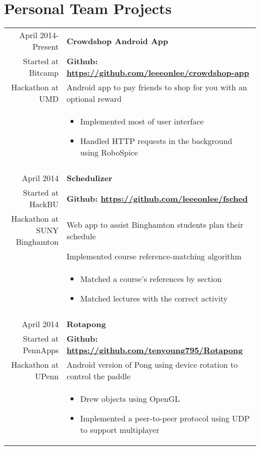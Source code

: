 \documentclass[letterpaper,10pt]{article} %
\begin{document}
\newpage
\section{Personal Team Projects}

\begin{longtable}{r|p{4.5in}}
    April 2014-Present & \textbf{Crowdshop Android App} \\
    Started at Bitcamp & \textbf{Github: \url{https://github.com/leeeonlee/crowdshop-app}} \\
    Hackathon at UMD & Android app to pay friends to shop for you with an optional reward \\
    & \begin{itemize}
        \item Implemented most of user interface
        \item Handled HTTP requests in the background using RoboSpice
    \end{itemize} \\

    \multicolumn{2}{c}{} \\

    April 2014 & \textbf{Schedulizer} \\
    Started at HackBU & \textbf{Github: \url{https://github.com/leeeonlee/fsched}} \\
    Hackathon at SUNY Binghamton & Web app to assist Binghamton students plan their schedule \\
    & Implemented course reference-matching algorithm \\ 
    & \begin{itemize}
        \item Matched a course's references by section
        \item Matched lectures with the correct activity
    \end{itemize} \\

    \multicolumn{2}{c}{} \\

    April 2014 & \textbf{Rotapong} \\
    Started at PennApps  & \textbf{Github: \url{https://github.com/tenyoung795/Rotapong}} \\
    Hackathon at UPenn & Android version of Pong using device rotation to control the paddle \\
    & \begin{itemize}
        \item Drew objects using OpenGL
        \item Implemented a peer-to-peer protocol using UDP to support multiplayer
    \end{itemize}

\end{longtable}
\end{document}
